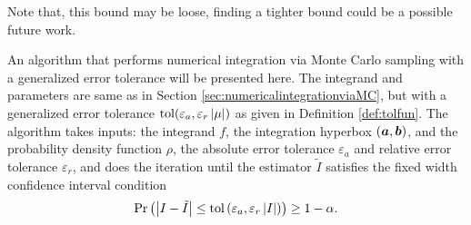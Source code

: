 \documentclass{iitthesis}
\theoremstyle{definition}
\begin{document}
Note that, this bound may be loose, finding a tighter bound could be a possible future work.

\bigskip

\label{sec:cubmcgalg}

An algorithm that performs numerical integration via Monte Carlo sampling with a generalized error tolerance will be presented here. The integrand and parameters are same as in Section \ref{sec:numericalintegrationviaMC}, but with a generalized error tolerance $\operatorname{tol}(\varepsilon_a, \varepsilon_r\left \lvert \mu \right \rvert)$ as given in Definition \ref{def:tolfun}. The algorithm takes inputs: the integrand $f$, the integration hyperbox $(\boldsymbol{a}, \boldsymbol{b})$, and the probability density function $\rho$, the absolute error tolerance $\varepsilon_a$ and relative error tolerance $\varepsilon_r$, and does the iteration until the estimator $\tilde{I}$ satisfies the fixed width confidence interval condition
\begin{align}\label{cubMCgCI}
\Pr \left(\left \lvert I-\tilde{I} \right \rvert \leq \operatorname{tol}\left(\varepsilon_a, \varepsilon_r\left \lvert I \right \rvert\right)\right) \geq 1-\alpha.
\end{align}
\end{document}
